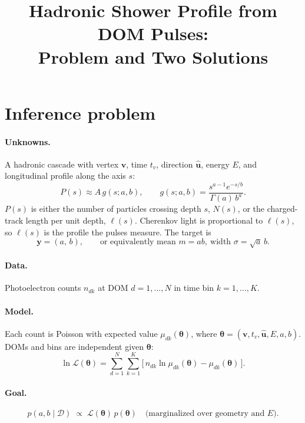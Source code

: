\documentclass[11pt]{article}
\title{Hadronic Shower Profile from DOM Pulses:\\ Problem and Two Solutions}
\author{}
\date{}
\newcommand{\D}{\mathcal{D}}
\begin{document}
\maketitle

\section{Inference problem}

\paragraph{Unknowns.}
A hadronic cascade with vertex $\bm{v}$, time $t_v$, direction $\hat{\bm{u}}$, energy $E$,
and longitudinal profile along the axis $s$:
\begin{equation}
  P(s) \approx A\, g(s;a,b), \qquad
  g(s;a,b) = \frac{s^{a-1}e^{-s/b}}{\Gamma(a)\,b^{a}} .
\end{equation}
$P(s)$ is either the number of particles crossing depth $s$, $N(s)$, or the charged-track
length per unit depth, $\ell(s)$. Cherenkov light is proportional to $\ell(s)$, so $\ell(s)$
is the profile the pulses measure. The target is
\begin{equation}
  \bm{y} = (a,\, b), \qquad \text{or equivalently mean } m = ab,\ \text{width } \sigma = \sqrt{a}\,b .
\end{equation}

\paragraph{Data.}
Photoelectron counts $n_{dk}$ at DOM $d = 1,\dots,N$ in time bin $k = 1,\dots,K$.

\paragraph{Model.}
Each count is Poisson with expected value $\mu_{dk}(\bm{\theta})$, where
$\bm{\theta} = (\bm{v}, t_v, \hat{\bm{u}}, E, a, b)$. DOMs and bins are independent given $\bm{\theta}$:
\begin{equation}
  \ln \mathcal{L}(\bm{\theta}) = \sum_{d=1}^{N}\sum_{k=1}^{K}
  \Big[\, n_{dk}\ln\mu_{dk}(\bm{\theta}) - \mu_{dk}(\bm{\theta}) \,\Big].
\end{equation}

\paragraph{Goal.}
\begin{equation}
  p(a,b \mid \D) \;\propto\; \mathcal{L}(\bm{\theta})\, p(\bm{\theta})
  \quad \text{(marginalized over geometry and } E\text{)}.
\end{equation}
\end{document}
